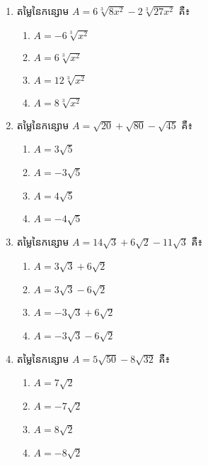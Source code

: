 \begin{enumerate}
\item តម្លៃនៃកន្សោម $A=6\sqrt[3]{8x^2}-2\sqrt[3]{27x^2}$ គឺ៖
\begin{multicols}{4}
\begin{enumerate}[label=\alph*.]
	\item $A=-6\sqrt[3]{x^2}$
	\item $A=6\sqrt[3]{x^2}$
	\item $A=12\sqrt[3]{x^2}$
	\item $A=8\sqrt[3]{x^2}$
\end{enumerate}
\end{multicols}

\item តម្លៃនៃកន្សោម $A=\sqrt{20}+\sqrt{80}-\sqrt{45}$ គឺ៖
\begin{multicols}{4}
\begin{enumerate}[label=\alph*.]
	\item $A=3\sqrt{5}$
	\item $A=-3\sqrt{5}$
	\item $A=4\sqrt{5}$
	\item $A=-4\sqrt{5}$
\end{enumerate}
\end{multicols}


\item តម្លៃនៃកន្សោម $A=14\sqrt{3}+6\sqrt{2}-11\sqrt{3}$ គឺ៖
\begin{multicols}{2}
\begin{enumerate}[label=\alph*.]
	\item $A=3\sqrt{3}+6\sqrt{2}$
	\item $A=3\sqrt{3}-6\sqrt{2}$
	\item $A=-3\sqrt{3}+6\sqrt{2}$
	\item $A=-3\sqrt{3}-6\sqrt{2}$
\end{enumerate}
\end{multicols}

\item តម្លៃនៃកន្សោម $A=5\sqrt{50}-8\sqrt{32}$ គឺ៖
\begin{multicols}{4}
\begin{enumerate}[label=\alph*.]
	\item $A=7\sqrt{2}$
	\item $A=-7\sqrt{2}$
	\item $A=8\sqrt{2}$
	\item $A=-8\sqrt{2}$
\end{enumerate}
\end{multicols}


\end{enumerate}
